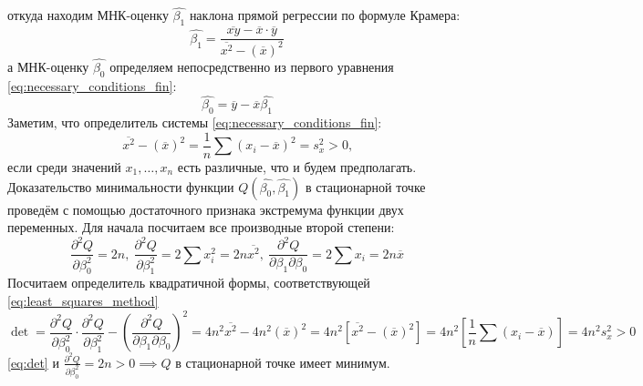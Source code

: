 откуда находим МНК-оценку $\hat{\beta_1}$ наклона прямой регрессии по формуле Крамера:
\begin{equation} \label{eq:beta_0}
	\hat{\beta_1} = \dfrac{\overline{x y} - \overline{x} \cdot \overline{y}}{\overline{x^2} - (\overline{x})^2}
\end{equation}
а МНК-оценку $\hat{\beta_0}$ определяем непосредственно из первого уравнения \eqref{eq:necessary_conditions_fin}:
\begin{equation} \label{eq:beta_1}
	\hat{\beta_0} = \overline{y} - \overline{x} \hat{\beta_1}
\end{equation}
Заметим, что определитель системы \eqref{eq:necessary_conditions_fin}:
\begin{equation}
	\overline{x^2} - (\overline{x})^2 = \frac{1}{n} \sum (x_i - \overline{x})^2 = s_{x}^2 > 0 \text{,}
\end{equation}
если среди значений $x_1, \dots, x_n$ есть различные, что и будем предполагать. \\
Доказательство минимальности функции $Q(\hat{\beta_0}, \hat{\beta_1})$ в стационарной точке проведём с помощью достаточного признака экстремума функции двух переменных. Для начала посчитаем все производные второй степени:
\begin{equation}
	\dfrac{\partial^2 Q}{\partial \beta_{0}^2} = 2n, \ 
	\dfrac{\partial^2 Q}{\partial \beta_{1}^2} = 2 \sum x_{i}^2 = 2 n \overline{x^2}, \ 
	\dfrac{\partial^2 Q}{\partial \beta_{1} \partial \beta_{0}} = 2 \sum x_i = 2 n \overline{x}
\end{equation}
Посчитаем определитель квадратичной формы, соответствующей \eqref{eq:least_squares_method}
\begin{equation} \label{eq:det}
	\det = \dfrac{\partial^2 Q}{\partial \beta_{0}^2} \cdot \dfrac{\partial^2 Q}{\partial \beta_{1}^2} - (\dfrac{\partial^2 Q}{\partial \beta_{1} \partial \beta_{0}})^2 = 
	4 n^2 \overline{x^2} - 4 n^2 (\overline{x})^2 =
	4 n^2 [\overline{x^2} - (\overline{x})^2] = 
	4 n^2 [\dfrac{1}{n} \sum (x_i - \overline{x})] = 4 n^2 s_{x}^2 > 0
\end{equation} 
\eqref{eq:det} и $\frac{\partial^2 Q}{\partial \beta_{0}^2} = 2 n > 0 \implies Q \text{ в стационарной точке имеет минимум.}$   

